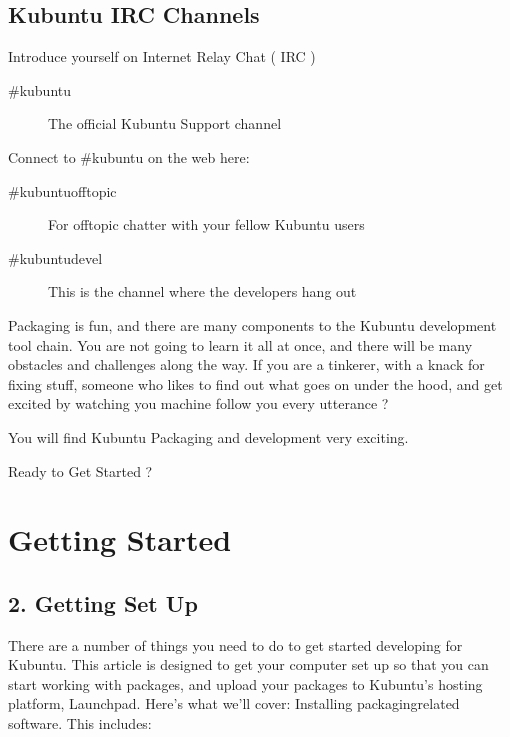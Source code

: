 \documentclass[letterpaper,10pt,english]{sphinxmanual}
\begin{document}
\subsection{Kubuntu IRC Channels}
\label{\detokenize{docs/packaging-guide/welcome:kubuntu-irc-channels}}
\sphinxAtStartPar
Introduce yourself on Internet Relay Chat ( IRC )
\begin{description}
\item[{\#kubuntu}] \leavevmode
\sphinxAtStartPar
The official Kubuntu Support channel

\end{description}

\sphinxAtStartPar
Connect to \#kubuntu on the web here: 
\begin{description}
\item[{\#kubuntu\sphinxhyphen{}offtopic}] \leavevmode
\sphinxAtStartPar
For off\sphinxhyphen{}topic chatter with your fellow Kubuntu users

\item[{\#kubuntu\sphinxhyphen{}devel}] \leavevmode
\sphinxAtStartPar
This is the channel where the developers hang out

\end{description}

\sphinxAtStartPar
Packaging is fun, and there are many components to the Kubuntu development tool chain. You are not going to learn it all at once, and there will be many obstacles and challenges along the way.
If you are a tinkerer, with a knack for fixing stuff, someone who likes to find out what goes on under the hood, and get excited by watching you machine follow you every utterance ?

\sphinxAtStartPar
You will find Kubuntu Packaging and development very exciting.

\sphinxAtStartPar
Ready to Get Started ?


\section{Getting Started}
\label{\detokenize{docs/packaging-guide/getting-started:getting-started}}\label{\detokenize{docs/packaging-guide/getting-started::doc}}

\subsection{2. Getting Set Up}
\label{\detokenize{docs/packaging-guide/getting-started:getting-set-up}}
\sphinxAtStartPar
There are a number of things you need to do to get started developing for Kubuntu. This article is designed to get your computer set up so that you can start working with packages, and upload your packages to Kubuntu’s hosting platform, Launchpad. Here’s what we’ll cover:
Installing packaging\sphinxhyphen{}related software. This includes:
\end{document}
